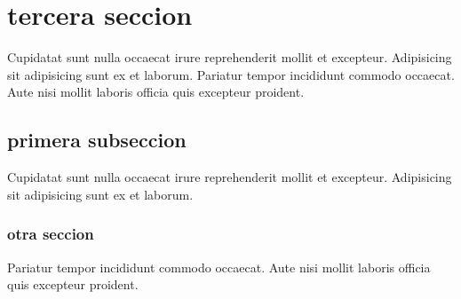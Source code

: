\documentclass{article}
\begin{document}

\section{tercera seccion}
Cupidatat sunt nulla occaecat irure reprehenderit mollit et excepteur. Adipisicing sit adipisicing sunt ex et laborum. Pariatur tempor incididunt commodo occaecat. Aute nisi mollit laboris officia quis excepteur proident.

\subsection{primera subseccion}
Cupidatat sunt nulla occaecat irure reprehenderit mollit et excepteur. Adipisicing sit adipisicing sunt ex et laborum.

\subsubsection{otra seccion}

Pariatur tempor incididunt commodo occaecat. Aute nisi mollit laboris officia quis excepteur proident.
\end{document}

